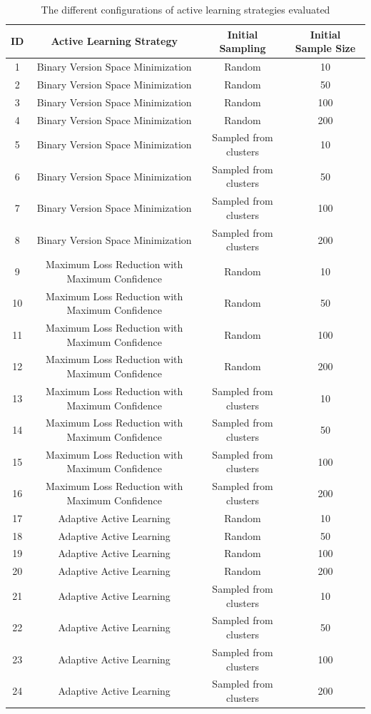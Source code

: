 \begin{table}
    \begin{tabular}{|cccc|}
        \hline
        \textbf{ID} & \textbf{Active Learning Strategy} & \textbf{Initial Sampling} & \textbf{Initial Sample Size}\\
        \hline
        1 & Binary Version Space Minimization & Random & 10\\
        2 & Binary Version Space Minimization & Random & 50\\
        3 & Binary Version Space Minimization & Random & 100\\
        4 & Binary Version Space Minimization & Random & 200\\
        5 & Binary Version Space Minimization & Sampled from clusters & 10\\
        6 & Binary Version Space Minimization & Sampled from clusters & 50\\
        7 & Binary Version Space Minimization & Sampled from clusters & 100\\
        8 & Binary Version Space Minimization & Sampled from clusters & 200\\
        9 & Maximum Loss Reduction with Maximum Confidence & Random & 10\\
        10 & Maximum Loss Reduction with Maximum Confidence & Random & 50\\
        11 & Maximum Loss Reduction with Maximum Confidence & Random & 100\\
        12 & Maximum Loss Reduction with Maximum Confidence & Random & 200\\
        13 & Maximum Loss Reduction with Maximum Confidence & Sampled from clusters & 10\\
        14 & Maximum Loss Reduction with Maximum Confidence & Sampled from clusters & 50\\
        15 & Maximum Loss Reduction with Maximum Confidence & Sampled from clusters & 100\\
        16 & Maximum Loss Reduction with Maximum Confidence & Sampled from clusters & 200\\
        17 & Adaptive Active Learning & Random & 10\\
        18 & Adaptive Active Learning & Random & 50\\
        19 & Adaptive Active Learning & Random & 100\\
        20 & Adaptive Active Learning & Random & 200\\
        21 & Adaptive Active Learning & Sampled from clusters & 10\\
        22 & Adaptive Active Learning & Sampled from clusters & 50\\
        23 & Adaptive Active Learning & Sampled from clusters & 100\\
        24 & Adaptive Active Learning & Sampled from clusters & 200\\
        \hline
    \end{tabular}
    \caption{The different configurations of active learning strategies evaluated}
    \label{fig:active-learning-configurations}
\end{table}
